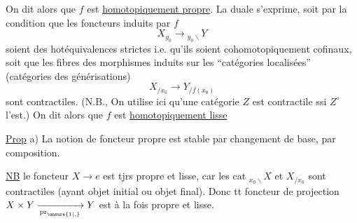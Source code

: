 On dit alors que $f$ est \uline{homotopiquement propre}. La   duale s'exprime, soit par la condition que les foncteurs induits par $f$
\[
 X_{y_0}\longrightarrow {}_{y_0\backslash}Y
\]
soient des hotéquivalences strictes i.e. qu'ils soient cohomotopiquement cofinaux, soit que les fibres des morphismes induits sur les ``catégories localisées'' (catégories des générisations)
\[
 X_{/x_0}\longrightarrow Y_{/f(x_0)}
\]
sont contractiles. (N.B., On utilise ici qu'une catégorie $Z$ est contractile ssi $Z^\circ$ l'est.) On dit alors que $f$ est \uline{homotopiquement lisse}

\uline{Prop} a) La notion de foncteur propre  est stable par changement de base, par composition.  


 \uline{NB} le foncteur $X\to e$ est tjrs propre et lisse, car les cat ${}_{x_0\backslash}X$ et $X_{/x_0}$ sont contractiles (ayant objet initial ou objet final). Donc tt foncteur de projection $X\times Y\xrightarrow[\mathrm{pr}_{\unsure{1|,}}]{}Y$ est à la fois propre et lisse.
